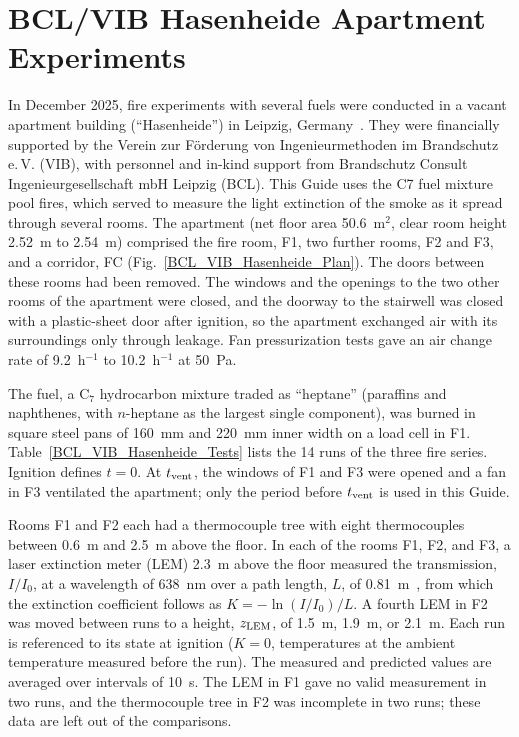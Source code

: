 \section{BCL/VIB Hasenheide Apartment Experiments}
\label{BCL_VIB_Hasenheide_Description}

In December 2025, fire experiments with several fuels were conducted in a vacant apartment building (``Hasenheide'') in Leipzig, Germany~\cite{Osburg:Hasenheide_Paper,Osburg:Hasenheide_Data}. They were financially supported by the Verein zur F\"{o}rderung von Ingenieurmethoden im Brandschutz e.\,V. (VIB), with personnel and in-kind support from Brandschutz Consult Ingenieurgesellschaft mbH Leipzig (BCL). This Guide uses the C7 fuel mixture pool fires, which served to measure the light extinction of the smoke as it spread through several rooms. The apartment (net floor area 50.6~m$^2$, clear room height 2.52~m to 2.54~m) comprised the fire room, F1, two further rooms, F2 and F3, and a corridor, FC (Fig.~\ref{BCL_VIB_Hasenheide_Plan}). The doors between these rooms had been removed. The windows and the openings to the two other rooms of the apartment were closed, and the doorway to the stairwell was closed with a plastic-sheet door after ignition, so the apartment exchanged air with its surroundings only through leakage. Fan pressurization tests gave an air change rate of 9.2~h$^{-1}$ to 10.2~h$^{-1}$ at 50~Pa.

The fuel, a C$_7$ hydrocarbon mixture traded as ``heptane'' (paraffins and naphthenes, with $n$-heptane as the largest single component), was burned in square steel pans of 160~mm and 220~mm inner width on a load cell in F1. Table~\ref{BCL_VIB_Hasenheide_Tests} lists the 14 runs of the three fire series. Ignition defines $t=0$. At $t_{\rm vent}$, the windows of F1 and F3 were opened and a fan in F3 ventilated the apartment; only the period before $t_{\rm vent}$ is used in this Guide.

Rooms F1 and F2 each had a thermocouple tree with eight thermocouples between 0.6~m and 2.5~m above the floor. In each of the rooms F1, F2, and F3, a laser extinction meter (LEM) 2.3~m above the floor measured the transmission, $I/I_0$, at a wavelength of 638~nm over a path length, $L$, of 0.81~m~\cite{Schelhorn:LEM_2026}, from which the extinction coefficient follows as $K=-\ln(I/I_0)/L$. A fourth LEM in F2 was moved between runs to a height, $z_{\rm LEM}$, of 1.5~m, 1.9~m, or 2.1~m. Each run is referenced to its state at ignition ($K=0$, temperatures at the ambient temperature measured before the run). The measured and predicted values are averaged over intervals of 10~s. The LEM in F1 gave no valid measurement in two runs, and the thermocouple tree in F2 was incomplete in two runs; these data are left out of the comparisons.


